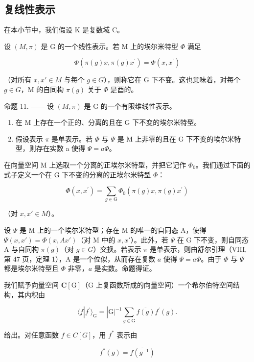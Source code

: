 \subsection{复线性表示}

在本小节中，我们假设 K 是复数域 C。

设 \((M,\pi)\) 是 G 的一个线性表示。若 M 上的埃尔米特型 \(\Phi\) 满足

\[
\Phi (\pi (g) x, \pi (g) x ^ {\prime}) = \Phi (x, x ^ {\prime})\tag{48}
\]

（对所有 \(x, x' \in M\) 与每个 \(g \in G\)），则称它在 G 下不变。这也意味着，对每个 \(g \in G\)，M 的自同构 \(\pi(g)\) 关于 \(\Phi\) 是酉的。

命题 11. —— 设 \((M,\pi)\) 是 G 的一个有限维线性表示。

\begin{enumerate}
\def\labelenumi{\alph{enumi})}
\item
  在 M 上存在一个正的、分离的且在 G 下不变的埃尔米特型。
\item
  假设表示 \(\pi\) 是单表示。若 \(\Phi\) 与 \(\Psi\) 是 M 上非零的且在 G 下不变的埃尔米特型，则存在实数 a 使得 \(\Psi = a\Phi\)。
\end{enumerate}

在向量空间 M 上选取一个分离的正埃尔米特型，并把它记作 \(\Phi_{0}\)。我们通过下面的式子定义一个在 G 下不变的分离的正埃尔米特型 \(\Phi\)：

\[
\Phi (x, x ^ {\prime}) = \sum_ {g \in \mathrm{G}} \Phi_ {0} (\pi (g) x, \pi (g) x ^ {\prime})\tag{49}
\]

（对 \(x, x' \in M\)）。

设 \(\Psi\) 是 M 上的一个埃尔米特型；存在 M 的唯一的自同态 A，使得 \(\Psi(x, x') = \Phi(x, Ax')\)（对 M 中的 \(x, x'\)）。此外，若 \(\Psi\) 在 G 下不变，则自同态 A 与自同构 \(\pi(g)\)（对 \(g \in G\)）交换。若表示 \(\pi\) 是单表示，则由舒尔引理（VIII, 第 47 页，定理 1），A 是一个位似，从而存在复数 \(a\) 使得 \(\Psi = a\Phi\)。由于 \(\Phi\) 与 \(\Psi\) 都是埃尔米特型且 \(\Phi\) 非零，\(a\) 是实数。命题得证。

我们赋予向量空间 \(\mathbf{C}[\mathrm{G}]\)（\(\mathrm{G}\) 上复函数所成的向量空间）一个希尔伯特空间结构，其内积由

\[
\langle f | f ^ {\prime} \rangle_ {\mathrm{G}} = | \mathrm{G} | ^ {- 1} \sum_ {g \in \mathrm{G}} \overline {{f (g)}} f ^ {\prime} (g).\tag{50}
\]

给出。对任意函数 \(f \in C[G]\)，用 \(f^{*}\) 表示由

\[
f ^ {*} (g) = \overline {{f (g ^ {- 1})}}\tag{51}
\]

